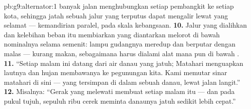 \begin{solution}{pb:g9:alternator:1}
banyak jalan menghubungkan setiap pembangkit ke setiap kota, sehingga
jatah sebuah jalur yang terputus dapat mengalir lewat  yang
selamat --- kemandirian paralel, pada skala kebangsaan.
\textbf{10.} Jalur yang dialihkan dan kelebihan beban itu membiarkan
 yang diantarkan melorot di bawah nominalnya selama semenit:
lampu gudangnya meredup dan  berputar dengan malas --- kurang
makan, sebagaimana harus dialami alat mana pun di bawah .
\textbf{11.} ``Setiap  malam ini datang dari air danau yang jatuh;
Matahari menguapkan lautnya dan hujan membawanya ke pegunungan kita.
Kami memutar sinar matahari di sini --- yang tersimpan di dalam sebuah
danau, lewat jalan langit.''
\textbf{12.} Misalnya: ``Gerak yang melewati  membuat setiap
 malam itu --- dan pada pukul tujuh, sepuluh ribu cerek meminta
danaunya jatuh sedikit lebih cepat.''
\end{solution}
